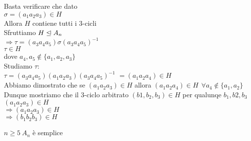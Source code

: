 \documentclass[12px]{article}
\begin{document}
	\begin{dimo}
		Basta verificare che dato \\
		$\sigma = (a_1a_2a_3)\in H$\\
		Allora $H$ contiene tutti i $3$-cicli\\
		Sfruttiamo $H\trianglelefteq A_n$\\
		$ \Rightarrow \tau = (a_3a_4a_5)\sigma(a_3a_4a_5)^{-1}$ \\
		$\tau\in H$\\
		dove  $a_4,a_5\not\in\{a_1,a_2,a_3\}$\\
		Studiamo $\tau:$\\
		$\tau = (a_3a_4a_5)(a_1a_2a_3)(a_3a_4a_5)^{-1}$ 
		$= (a_1a_2a_4)\in H$\\
		Abbiamo dimostrato che se $(a_1a_2a_3)\in H$ allora $(a_1a_2a_4)\in H \ \ \forall a_4\not\in\{a_1,a_2\}$\\
		Dunque mostriamo che il $3$-ciclo arbitrato $(b1,b_2,b_3)\in H$ per qualunqe $b_1,b2,b_3$\\
		$(a_1a_2a_3)\in H$\\
		$ \Rightarrow (a_1a_2a_3)\in H$\\
		$ \Rightarrow  (b_1b_2b_3)\in H$ \\

	\end{dimo}
	\begin{coro}
		$n\geq 5 \ A_n$ è semplice
	\end{coro}
\end{document}
